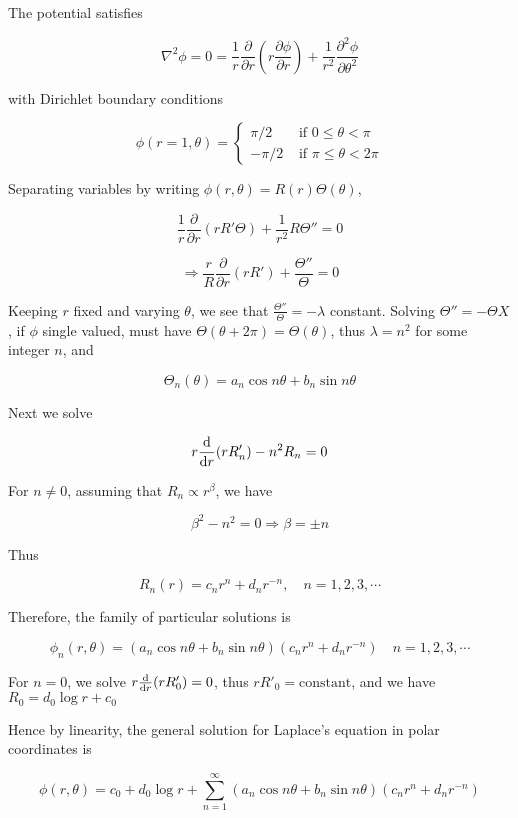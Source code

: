 \documentclass[a4paper]{article}
\begin{document}
The potential satisfies

\[ \nabla^{2} \phi = 0 = \frac{1}{r} \frac{\partial }{\partial r} \left(  r \frac{\partial \phi}{\partial r}  \right) + \frac{1}{r^{2}} \frac{\partial^{2} \phi}{\partial \theta^{2}}   \]

with Dirichlet boundary conditions

\[ \phi(r=1,\theta) = \begin{cases} \pi / 2  & \text{ if } 0 \leq \theta < \pi \\ - \pi / 2 & \text{ if } \pi \leq \theta < 2\pi \end{cases} \]

Separating variables by writing $ \phi(r,\theta) = R(r) \Theta(\theta) $,

\[ \frac{1}{r}  \frac{\partial }{\partial r} (  r R' \Theta )  + \frac{1}{r^{2}} R \Theta '' = 0   \]

\[ \Rightarrow \frac{r}{R}  \frac{\partial }{\partial r}  ( r R') + \frac{\Theta''}{\Theta}  = 0   \]

Keeping $ r $ fixed and varying $ \theta $, we see that $ \frac{\Theta''}{\Theta} = - \lambda $ constant.
Solving $ \Theta'' = - \Theta X $, if $ \phi $ single valued, must have $ \Theta(\theta + 2\pi) = \Theta(\theta)  $, thus $ \lambda = n^{2} $ for some integer $ n $, and 

\[ \Theta_{n}(\theta) = a_{n} \cos n \theta + b_{n} \sin n \theta  \]

Next we solve

\[ r \frac{\mathrm{d} }{\mathrm{d} r}(r R'_{n}) - n^{2} R_{n}= 0\]

For $ n \neq 0 $, assuming that $ R_{n} \propto r^{\beta} $, we have

\[ \beta^{2} - n^{2} = 0 \Rightarrow \beta = \pm n \]

Thus 

\[ R_{n}(r) = c_{n}r^{n} + d_{n} r^{-n}, \quad n = 1,2,3,\cdots \]

Therefore, the family of particular solutions is

\[ \phi_{n}(r,\theta) = (a_{n} \cos n \theta + b_{n} \sin n \theta)(c_{n}r^{n}  + d_{n} r^{-n} ) \quad n = 1,2,3,\cdots \]

For $ n = 0 $, we solve $ r \frac{\mathrm{d} }{\mathrm{d} r}(r R'_{0}) = 0 $, thus $ r R'_{0} = \text{constant} $, and we have $ R_{0} = d_{0} \log r + c_{0} $ 

Hence by linearity, the general solution for Laplace's equation in polar coordinates is

\[ \phi(r,\theta) = c_{0} + d_{0} \log r + \sum_{n=1}^{\infty}  (a_{n} \cos n \theta  + b_{n} \sin n \theta )(c_{n}r^{n}  + d_{n}r^{-n} )  \]
\end{document}
